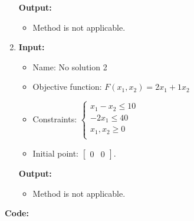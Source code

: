 \documentclass{article}
\begin{document}
\begin{enumerate}[label={(\arabic*)}, itemsep=0.25in]
          \textbf{Output:}
          \begin{itemize}
              \item Method is not applicable.
          \end{itemize}

    \item \textbf{Input:}
          \begin{itemize}
              \item Name: No solution 2
              \item Objective function: \(F(x_1, x_2) = 2 x_1 + 1 x_2\)
              \item Constraints: \(\begin{cases}
                        x_1 - x_2 \le 10 \\
                        -2 x_1 \le 40    \\
                        x_1, x_2 \ge 0   \\
                    \end{cases}\)
              \item Initial point: \(\begin{bmatrix} 0 & 0 \end{bmatrix}\).
          \end{itemize}

          \textbf{Output:}
          \begin{itemize}
              \item Method is not applicable.
          \end{itemize}
\end{enumerate}

\newpage

\textbf{Code:}


\newpage


\newpage


\newpage

\end{document}
